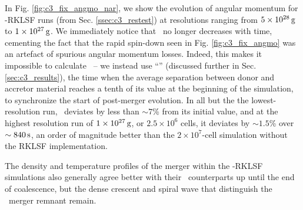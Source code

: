 
In Fig. \ref{fig:c3_fix_angmo_nar}, we show the evolution of angular momentum for \arepo-RKLSF runs (from Sec. \ref{ssec:c3_restest}) at resolutions ranging from $5\times10^{28}\,\mathrm{g}$ to $1\times10^{27}\,\mathrm{g}$.  We immediately notice that \Lzinner\ no longer decreases with time, cementing the fact that the rapid spin-down seen in Fig. \ref{fig:c3_fix_angmo} was an artefact of spurious angular momentum losses.  Indeed, this makes it impossible to calculate \tlm\ -- we instead use ``\tcoal'' (discussed further in Sec. \ref{sec:c3_results}), the time when the average separation between donor and accretor material reaches a tenth of its value at the beginning of the simulation, to synchronize the start of post-merger evolution.  In all but the the lowest-resolution run, \Lztot\ deviates by less than $\sim7$\% from its initial value, and at the highest resolution run of $1\times10^{27}\,\mathrm{g}$, or $2.5\times10^6$ cells, it deviates by $\sim1.5$\% over $\sim840\,\mathrm{s}$, an order of magnitude better than the $2\times10^7$-cell simulation without the RKLSF implementation.

The density and temperature profiles of the merger within the \arepo-RKLSF simulations also generally agree better with their \gasoline\ counterparts up until the end of coalescence, but the dense crescent and spiral wave that distinguish the \arepo\ merger remnant remain.
